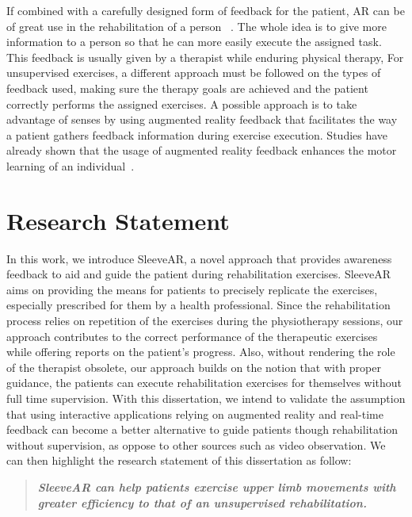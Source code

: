 If combined with a carefully designed form of feedback for the patient,
\ac{AR} can be of great use in the rehabilitation of a person ~\cite{Sigrist2013}. 
The whole idea is to give more information to a person so that he can more easily execute the assigned task.
This feedback is usually given by a therapist while enduring physical therapy, 
For unsupervised exercises, a different approach must be followed on the types of feedback used, making sure the therapy goals are achieved and the patient correctly performs the assigned exercises.
A possible approach is to take advantage of senses by using augmented reality feedback that facilitates the way a patient gathers feedback information during exercise execution. 
Studies have already shown that the usage of augmented reality feedback enhances the motor learning of an individual~\cite{Sigrist2013}.

\section{Research Statement}

In this work, we introduce SleeveAR, a novel approach that provides awareness feedback to aid and guide the patient during rehabilitation exercises. SleeveAR aims on providing the means for patients to precisely replicate the exercises, especially prescribed for them by a health professional. Since the rehabilitation process relies on repetition of the exercises during the physiotherapy sessions, our approach contributes to the correct performance of the therapeutic exercises while offering reports on the patient's progress. Also, without rendering the role of the therapist obsolete, our approach builds on the notion that with proper guidance, the patients can execute rehabilitation exercises for themselves without full time supervision.
With this dissertation, we intend to validate the assumption that using interactive applications relying on augmented reality and real-time feedback can become a better alternative to guide patients though rehabilitation without supervision, as oppose to other sources such as video observation. We can then highlight the research statement of this dissertation as follow:


\begin{quotation}
\noindent \textit {\textbf { SleeveAR can help patients exercise upper limb movements with greater efficiency to that of an unsupervised rehabilitation.}}

\end{quotation}


